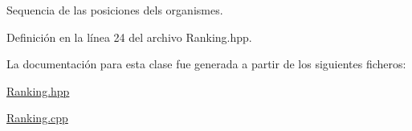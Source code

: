 Sequencia de las posiciones dels organismes. 



Definición en la línea 24 del archivo Ranking.\-hpp.



La documentación para esta clase fue generada a partir de los siguientes ficheros\-:\begin{DoxyCompactItemize}
\item 
\hyperlink{_ranking_8hpp}{Ranking.\-hpp}\item 
\hyperlink{_ranking_8cpp}{Ranking.\-cpp}\end{DoxyCompactItemize}
